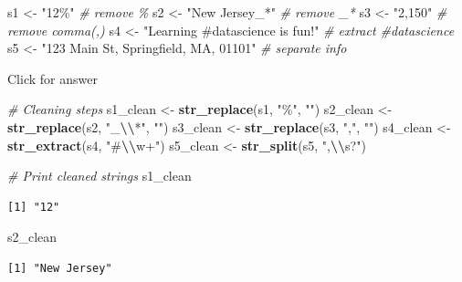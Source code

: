 \documentclass[
]{book}
\newenvironment{Shaded}{\begin{snugshade}}{\end{snugshade}}
\newcommand{\CommentTok}[1]{\textcolor[rgb]{0.56,0.35,0.01}{\textit{#1}}}
\newcommand{\FunctionTok}[1]{\textcolor[rgb]{0.13,0.29,0.53}{\textbf{#1}}}
\newcommand{\NormalTok}[1]{#1}
\newcommand{\OtherTok}[1]{\textcolor[rgb]{0.56,0.35,0.01}{#1}}
\newcommand{\SpecialCharTok}[1]{\textcolor[rgb]{0.81,0.36,0.00}{\textbf{#1}}}
\newcommand{\StringTok}[1]{\textcolor[rgb]{0.31,0.60,0.02}{#1}}
\begin{document}
\begin{Shaded}
\begin{Highlighting}[]
\NormalTok{s1 }\OtherTok{\textless{}{-}} \StringTok{"12\%"}  \CommentTok{\# remove \%}
\NormalTok{s2 }\OtherTok{\textless{}{-}} \StringTok{"New Jersey\_*"}  \CommentTok{\# remove \_*}
\NormalTok{s3 }\OtherTok{\textless{}{-}} \StringTok{"2,150"}    \CommentTok{\# remove comma(,)}
\NormalTok{s4 }\OtherTok{\textless{}{-}} \StringTok{"Learning \#datascience is fun!"}   \CommentTok{\# extract \#datascience}
\NormalTok{s5 }\OtherTok{\textless{}{-}} \StringTok{"123 Main St, Springfield, MA, 01101"}   \CommentTok{\# separate info}
\end{Highlighting}
\end{Shaded}

Click for answer

\begin{Shaded}
\begin{Highlighting}[]
\CommentTok{\# Cleaning steps}
\NormalTok{s1\_clean }\OtherTok{\textless{}{-}} \FunctionTok{str\_replace}\NormalTok{(s1, }\StringTok{"\%"}\NormalTok{, }\StringTok{""}\NormalTok{)}
\NormalTok{s2\_clean }\OtherTok{\textless{}{-}} \FunctionTok{str\_replace}\NormalTok{(s2, }\StringTok{"\_}\SpecialCharTok{\textbackslash{}\textbackslash{}}\StringTok{*"}\NormalTok{, }\StringTok{""}\NormalTok{)}
\NormalTok{s3\_clean }\OtherTok{\textless{}{-}} \FunctionTok{str\_replace}\NormalTok{(s3, }\StringTok{","}\NormalTok{, }\StringTok{""}\NormalTok{)}
\NormalTok{s4\_clean }\OtherTok{\textless{}{-}} \FunctionTok{str\_extract}\NormalTok{(s4, }\StringTok{"\#}\SpecialCharTok{\textbackslash{}\textbackslash{}}\StringTok{w+"}\NormalTok{)}
\NormalTok{s5\_clean }\OtherTok{\textless{}{-}} \FunctionTok{str\_split}\NormalTok{(s5, }\StringTok{",}\SpecialCharTok{\textbackslash{}\textbackslash{}}\StringTok{s?"}\NormalTok{)}

\CommentTok{\# Print cleaned strings}
\NormalTok{s1\_clean}
\end{Highlighting}
\end{Shaded}

\begin{verbatim}
[1] "12"
\end{verbatim}

\begin{Shaded}
\begin{Highlighting}[]
\NormalTok{s2\_clean}
\end{Highlighting}
\end{Shaded}

\begin{verbatim}
[1] "New Jersey"
\end{verbatim}
\end{document}
